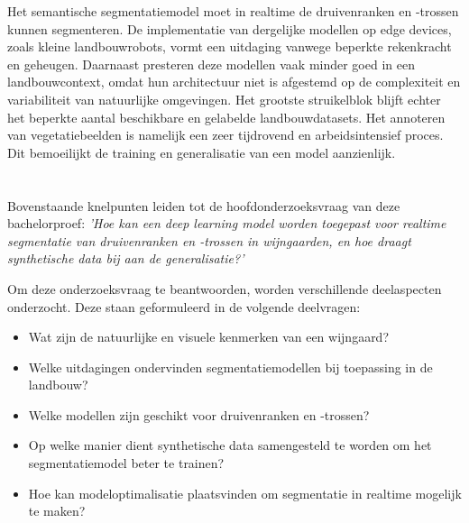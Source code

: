Het semantische segmentatiemodel moet in realtime de druivenranken en -trossen kunnen segmenteren. De implementatie van dergelijke modellen op edge devices, zoals kleine landbouwrobots, vormt een uitdaging vanwege beperkte rekenkracht en geheugen. Daarnaast presteren deze modellen vaak minder goed in een landbouwcontext, omdat hun architectuur niet is afgestemd op de complexiteit en variabiliteit van natuurlijke omgevingen. Het grootste struikelblok blijft echter het beperkte aantal beschikbare en gelabelde landbouwdatasets. Het annoteren van vegetatiebeelden is namelijk een zeer tijdrovend en arbeidsintensief proces. Dit bemoeilijkt de training en generalisatie van een model aanzienlijk.

\section{}%
\label{sec:onderzoeksvraag}

Bovenstaande knelpunten leiden tot de hoofdonderzoeksvraag van deze bachelorproef: \emph{'Hoe kan een deep learning model worden toegepast voor realtime segmentatie van druivenranken en -trossen in wijngaarden, en hoe draagt synthetische data bij aan de generalisatie?'} 

Om deze onderzoeksvraag te beantwoorden, worden verschillende deelaspecten onderzocht. Deze staan geformuleerd in de volgende deelvragen:

\begin{itemize}
    \setlength{\itemsep}{0pt}
    \setlength{\parskip}{0pt}
    \item Wat zijn de natuurlijke en visuele kenmerken van een wijngaard?
    \item Welke uitdagingen ondervinden segmentatiemodellen bij toepassing in de landbouw?
    \item Welke modellen zijn geschikt voor druivenranken en -trossen?
    \item Op welke manier dient synthetische data samengesteld te worden om het segmentatiemodel beter te trainen?
    \item Hoe kan modeloptimalisatie plaatsvinden om segmentatie in realtime mogelijk te maken?
\end{itemize}

\section{}%
\label{sec:onderzoeksdoelstelling}

